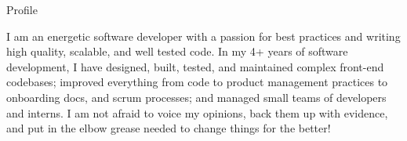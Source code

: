 \documentclass[]{mcdowellcv}
\begin{document}
	\makeheader

	\begin{cvsection}{Profile}
		\vspace{2pt}
		\begin{cvsubsection}{}{}{}
			I am an energetic software developer with a passion for best practices and writing high quality, scalable, and well tested code. In my 4+ years of software development, I have designed, built, tested, and maintained complex front-end codebases; improved everything from code to product management practices to onboarding docs, and scrum processes; and managed small teams of developers and interns. I am not afraid to voice my opinions, back them up with evidence,
			and put in the elbow grease needed to change things for the better!
		\end{cvsubsection}
	\end{cvsection}
\end{document}

